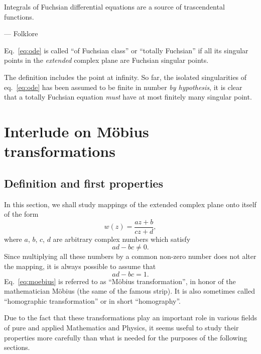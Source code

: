 \begin{approfondimento}
   Integrals of Fuchsian differential equations are a source of
   trascendental functions.
   \begin{flushright}
      --- Folklore
   \end{flushright}
\end{approfondimento}

\begin{definition}
   Eq.~\eqref{eq:ode} is called ``of Fuchsian class'' or ``totally
   Fuchsian'' if all its singular points  in the \emph{extended} complex plane are
   Fuchsian singular points.
\end{definition}

The definition includes the point at infinity. 
So far, the isolated singularities of eq.~\eqref{eq:ode} has been
assumed to be finite  in number \emph{by hypothesis}, it is clear that a
totally Fuchsian equation \emph{must} have at most finitely many singular point.


\section{Interlude on M\"obius transformations}

\subsection{Definition and first properties}

In this section, we shall study mappings of the extended complex plane onto
itself of the form
\begin{dmath}[label={moebius}]
   w (z) = \frac{ a z + b}{cz +d } ,
\end{dmath}
where $a$, $b$, $c$, $d$ are arbitrary complex numbers which satisfy
\begin{dmath}
   ad -bc \neq 0.
\end{dmath}
Since multiplying all these numbers by a common non-zero number does not alter
the mapping,  it is always possible to assume that 
\begin{dmath}
   ad -bc = 1 .
\end{dmath}
Eq.~\eqref{eq:moebius} is referred to as ``M\"obius transformation'', in honor
of  the mathematician M\"obius 
(the same of the famous
strip).
It is also sometimes called ``homographic transformation'' or in short ``homography''.

Due to the fact that these transformations  play an important role in various fields of pure and applied Mathematics and
Physics, it seems useful to study their properties more carefully than what is
needed for the purposes of the following sections.

